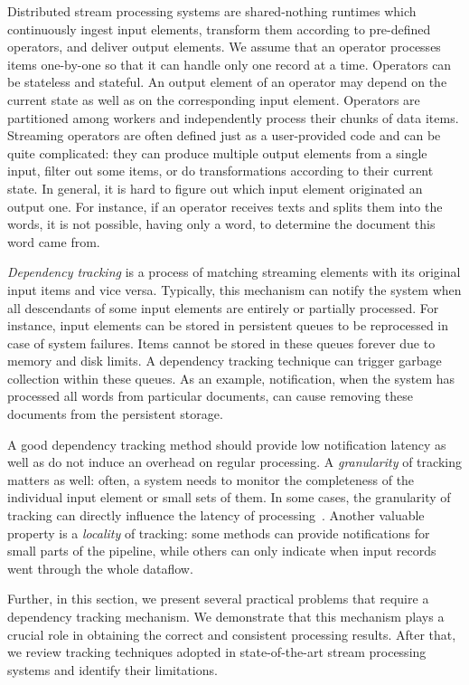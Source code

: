 \label {fs-acker-motivation}

Distributed stream processing systems are shared-nothing runtimes which continuously ingest input elements, transform them according to pre-defined operators, and deliver output elements. We assume that an operator processes items one-by-one so that it can handle only one record at a time. Operators can be stateless and stateful. An output element of an operator may depend on the current state as well as on the corresponding input element. Operators are partitioned among workers and independently process their chunks of data items. Streaming operators are often defined just as a user-provided code and can be quite complicated: they can produce multiple output elements from a single input, filter out some items, or do transformations according to their current state. In general, it is hard to figure out which input element originated an output one. For instance, if an operator receives texts and splits them into the words, it is not possible, having only a word, to determine the document this word came from.

{\em Dependency tracking} is a process of matching streaming elements with its original input items and vice versa. Typically, this mechanism can notify the system when all descendants of some input elements are entirely or partially processed. For instance, input elements can be stored in persistent queues to be reprocessed in case of system failures. Items cannot be stored in these queues forever due to memory and disk limits. A dependency tracking technique can trigger garbage collection within these queues. As an example, notification, when the system has processed all words from particular documents, can cause removing these documents from the persistent storage. 

A good dependency tracking method should provide low notification latency as well as do not induce an overhead on regular processing. A {\em granularity} of tracking matters as well: often, a system needs to monitor the completeness of the individual input element or small sets of them. In some cases, the granularity of tracking can directly influence the latency of processing~\cite{we2018adbis}. Another valuable property is a {\em locality} of tracking: some methods can provide notifications for small parts of the pipeline, while others can only indicate when input records went through the whole dataflow.

Further, in this section, we present several practical problems that require a dependency tracking mechanism. We demonstrate that this mechanism plays a crucial role in obtaining the correct and consistent processing results. After that, we review tracking techniques adopted in state-of-the-art stream processing systems and identify their limitations. 

